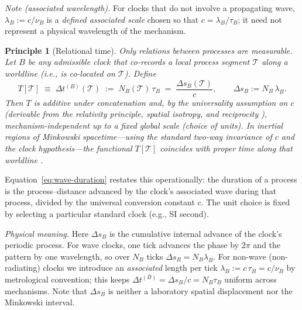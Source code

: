 \documentclass[12pt]{article}
\newtheorem*{principle}{Principle}
\begin{document}
\medskip
\noindent\emph{Note (associated wavelength).} For clocks that do not involve a propagating wave,
\(\lambda_B:=c/\nu_B\) is a \emph{defined associated scale} chosen so that \(c=\lambda_B/\tau_B\);
it need not represent a physical wavelength of the mechanism.

\medskip
\begin{principle}[Relational time]
Only relations between processes are measurable. Let \(B\) be any \emph{admissible} clock
that co-records a local process segment \(\mathcal T\) along a worldline (i.e., is co-located
on \(\mathcal T\)). Define
\[
T[\mathcal T]\;\equiv\;\Delta t^{(B)}(\mathcal T)
\;:=\; N_B(\mathcal T)\,\tau_B
\;=\; \frac{\Delta s_B(\mathcal T)}{c},
\qquad
\Delta s_B:=N_B\,\lambda_B .
\]
Then \(T\) is additive under concatenation and, by the universality assumption on \(c\)
(derivable from the relativity principle, spatial isotropy, and reciprocity \cite{BerziGorini1969,LevyLeblond1976,Mermin1984}),
mechanism-independent up to a fixed global scale (choice of units).
In inertial regions of Minkowski spacetime—using the standard two-way invariance of \(c\) and the clock hypothesis—the functional \(T[\mathcal T]\) coincides with proper time along that worldline \cite{Einstein1905,Rindler2006}.
\end{principle}

\newpage

\noindent Equation~\eqref{eq:wave-duration} restates this operationally: the duration of a
process is the process–distance advanced by the clock’s associated wave during that process,
divided by the universal conversion constant \(c\).
The unit choice is fixed by selecting a particular standard clock (e.g., SI second).

\medskip
\noindent\emph{Physical meaning.} Here \(\Delta s_B\) is the cumulative internal advance of the clock’s
periodic process. For wave clocks, one tick advances the phase by \(2\pi\) and the pattern by
one wavelength, so over \(N_B\) ticks \(\Delta s_B = N_B\lambda_B\). For non-wave (non-radiating)
clocks we introduce an \emph{associated} length per tick \(\lambda_B := c\,\tau_B = c/\nu_B\)
by metrological convention; this keeps \(\Delta t^{(B)}=\Delta s_B/c=N_B\tau_B\) uniform across
mechanisms. Note that \(\Delta s_B\) is neither a laboratory spatial displacement nor the
Minkowski interval.
\end{document}
